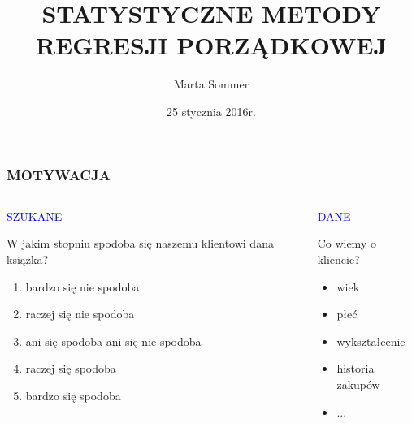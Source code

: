 \documentclass[11pt,usenames,dvipsnames,rgb,svgnames,x11names]{beamer}
\title{STATYSTYCZNE METODY \newline REGRESJI PORZĄDKOWEJ}
\author{Marta Sommer}
\institute{MiNI, Politechnika Warszawska}
\date{25 stycznia 2016r.}
\theoremstyle{plain}
\theoremstyle{definition}
\theoremstyle{remark}
\begin{document}
\begin{frame}
	\titlepage
\end{frame}



\begin{frame}
\frametitle{\textbf{MOTYWACJA}}

\begin{columns}[T]

\begin{column}{0.5\textwidth}
\begin{center}
\textcolor{blue}{SZUKANE}
\end{center}
W jakim stopniu spodoba się naszemu klientowi dana książka?
\begin{enumerate}[1)]
\item \textcolor{jeden}{bardzo się nie spodoba}
\item \textcolor{dwa}{raczej się nie spodoba}
\item \textcolor{trzy}{ani się spodoba ani się nie spodoba}
\item \textcolor{cztery}{raczej się spodoba}
\item \textcolor{piec}{bardzo się spodoba}
\end{enumerate}
\end{column}

\begin{column}{0.5\textwidth}
\begin{center}
\textcolor{blue}{DANE}
\end{center}

Co wiemy o kliencie?
\vspace{0.5cm}
\begin{itemize}
\item wiek
\item płeć
\item wykształcenie
\item historia zakupów
\item ...
\end{itemize}
\end{column}
  
\end{columns}  
  
\end{frame}
\end{document}
